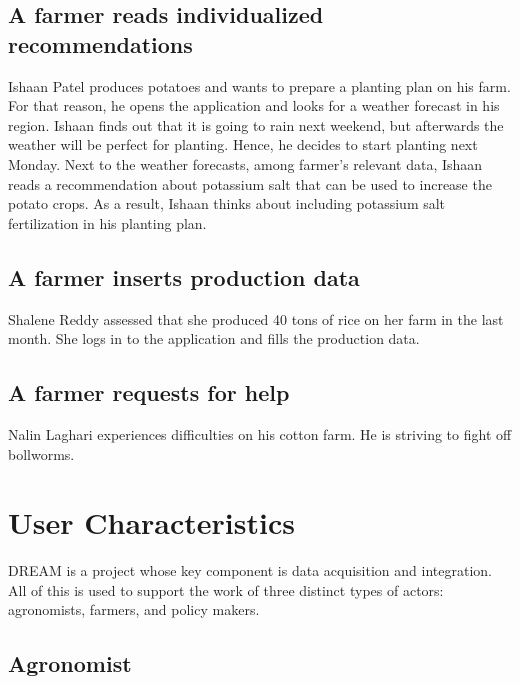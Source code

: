 \subsection*{A farmer reads individualized recommendations}
Ishaan Patel produces potatoes and wants to prepare a planting plan on his farm. For that reason, he opens the application and looks for a weather forecast in his region. Ishaan finds out that it is going to rain next weekend, but afterwards the weather will be perfect for planting. Hence, he decides to start planting next Monday. Next to the weather forecasts, among farmer's relevant data, Ishaan reads a recommendation about potassium salt that can be used to increase the potato crops. As a result, Ishaan thinks about including potassium salt fertilization in his planting plan. 

\subsection*{A farmer inserts production data}
Shalene Reddy assessed that she produced 40 tons of rice on her farm in the last month. She logs in to the application and fills the production data. %

\subsection*{A farmer requests for help}
Nalin Laghari experiences difficulties on his cotton farm. He is striving to fight off bollworms.

\section{User Characteristics}

DREAM is a project whose key component is data acquisition and integration. All of this is used to support the work of three distinct types of actors: agronomists, farmers, and policy makers.

\subsection{Agronomist}




